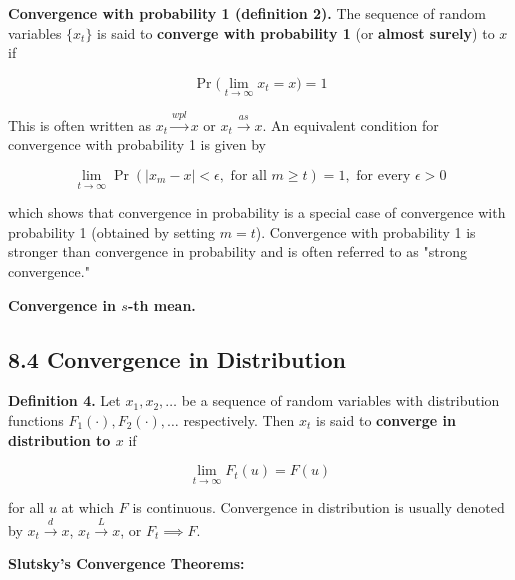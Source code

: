 \documentclass{article}
\begin{document}
\textbf{Convergence with probability 1 (definition 2).} The sequence of random variables \(\{x_t\}\) is said to \textbf{converge with probability 1} (or \textbf{almost surely}) to \(x\) if

\[
\Pr \bigg( \lim_{t \to \infty} x_t = x \bigg) = 1
\]

This is often written as \(x_t \xrightarrow{wpl} x\) or \(x_t \xrightarrow{as} x\). An equivalent condition for convergence with probability 1 is given by

\[
\lim_{t \to \infty} \Pr( |x_m - x| < \epsilon, \text{ for all } m \geq t) = 1, \text{ for every } \epsilon > 0
\]

which shows that convergence in probability is a special case of convergence with probability 1 (obtained by setting \(m = t\)). Convergence with probability 1 is stronger than convergence in probability and is often referred to as "strong convergence." 

\textbf{Convergence in \(s\)-th mean.}

\subsection{8.4 Convergence in Distribution}

\textbf{Definition 4.} Let \(x_1, x_2, \ldots\) be a sequence of random variables with distribution functions \(F_1(\cdot), F_2(\cdot), \ldots \) respectively. Then \(x_t\) is said to \textbf{converge in distribution to \(x\)} if

\[
\lim_{t \to \infty} F_t(u) = F(u)
\]

for all \(u\) at which \(F\) is continuous. Convergence in distribution is usually denoted by \(x_t \xrightarrow{d} x\), \(x_t \xrightarrow{L} x\), or \(F_t \implies F\).

\textbf{Slutsky's Convergence Theorems:}
\end{document}
